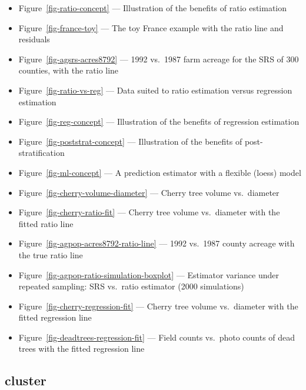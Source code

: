 \documentclass[
  letterpaper,
  DIV=11,
  numbers=noendperiod]{scrreprt}
\providecommand{\tightlist}{%
  \setlength{\itemsep}{0pt}\setlength{\parskip}{0pt}}
\renewcommand{\[}{\begin{equation}}
\renewcommand{\]}{\end{equation}}
\begin{document}
\begin{itemize}
\tightlist
\item
  Figure~\ref{fig-ratio-concept} --- Illustration of the benefits of
  ratio estimation
\item
  Figure~\ref{fig-france-toy} --- The toy France example with the ratio
  line and residuals
\item
  Figure~\ref{fig-agsrs-acres8792} --- 1992 vs.~1987 farm acreage for
  the SRS of 300 counties, with the ratio line
\item
  Figure~\ref{fig-ratio-vs-reg} --- Data suited to ratio estimation
  versus regression estimation
\item
  Figure~\ref{fig-reg-concept} --- Illustration of the benefits of
  regression estimation
\item
  Figure~\ref{fig-poststrat-concept} --- Illustration of the benefits of
  post-stratification
\item
  Figure~\ref{fig-ml-concept} --- A prediction estimator with a flexible
  (loess) model
\item
  Figure~\ref{fig-cherry-volume-diameter} --- Cherry tree volume
  vs.~diameter
\item
  Figure~\ref{fig-cherry-ratio-fit} --- Cherry tree volume vs.~diameter
  with the fitted ratio line
\item
  Figure~\ref{fig-agpop-acres8792-ratio-line} --- 1992 vs.~1987 county
  acreage with the true ratio line
\item
  Figure~\ref{fig-agpop-ratio-simulation-boxplot} --- Estimator variance
  under repeated sampling: SRS vs.~ratio estimator (2000 simulations)
\item
  Figure~\ref{fig-cherry-regression-fit} --- Cherry tree volume
  vs.~diameter with the fitted regression line
\item
  Figure~\ref{fig-deadtrees-regression-fit} --- Field counts vs.~photo
  counts of dead trees with the fitted regression line
\end{itemize}

\subsection{cluster}\label{cluster}
\end{document}
